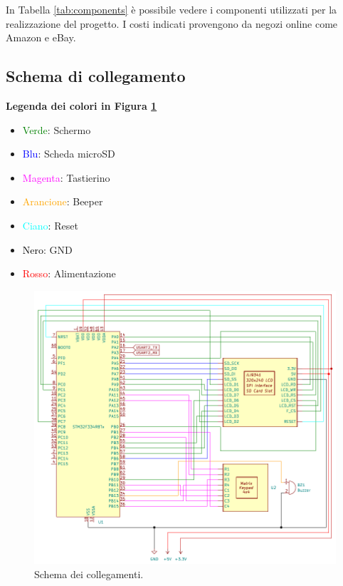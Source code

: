 \documentclass[a4paper]{article}
\begin{document}
In Tabella \ref{tab:components} è possibile vedere i componenti utilizzati per la
realizzazione del progetto. I costi indicati provengono da negozi online come Amazon e eBay.

\subsection{Schema di collegamento}

\textbf{Legenda dei colori in Figura \ref{fig:schema}}

\begin{multicols}{2}
\begin{itemize}
    \item \textcolor{green}{Verde}: Schermo
    \item \textcolor{blue}{Blu}: Scheda microSD
    \item \textcolor{magenta}{Magenta}: Tastierino
    \item \textcolor{orange}{Arancione}: Beeper
    \item \textcolor{cyan}{Ciano}: Reset
    \item \textcolor{black}{Nero}: GND
    \item \textcolor{red}{Rosso}: Alimentazione
\end{itemize}
\end{multicols}

\begin{figure}[h!t]
    \begin{center}
        \includegraphics[scale=1]{figures/STM32_CHIP8.pdf}
    \end{center}
    \caption{
        Schema dei collegamenti.
    }
    \label{fig:schema}
\end{figure}
\end{document}
